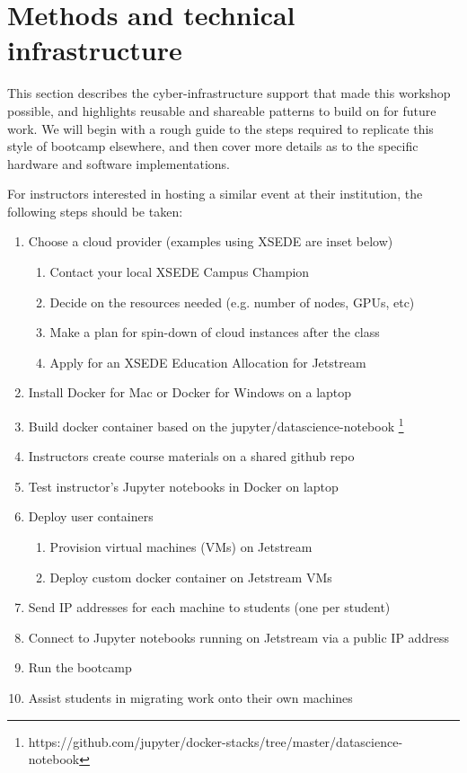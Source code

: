 \section{Methods and technical infrastructure}\label{sec:methods}

This section describes the cyber-infrastructure support that made this workshop possible, and
highlights reusable and shareable patterns to build on for future work. We will
begin with a rough guide to the steps required to replicate this style of
bootcamp elsewhere, and then cover more details as to the specific hardware and
software implementations.

For instructors interested in hosting a similar event at their institution, the
following steps should be taken:

\begin{enumerate}
\item Choose a cloud provider (examples using XSEDE are inset below)
  \begin{enumerate}
    \item Contact your local XSEDE Campus Champion
    \item Decide on the resources needed (e.g. number of nodes, GPUs, etc)
    \item Make a plan for spin-down of cloud instances after the class
    \item Apply for an XSEDE Education Allocation for Jetstream
  \end{enumerate}

\item Install Docker for Mac or Docker for Windows on a laptop
\item Build docker container based on the jupyter/datascience-notebook \footnote{https://github.com/jupyter/docker-stacks/tree/master/datascience-notebook}
\item Instructors create course materials on a shared github repo
\item Test instructor's Jupyter notebooks in Docker on laptop
\item Deploy user containers
  \begin{enumerate}
  \item Provision virtual machines (VMs) on Jetstream
  \item Deploy custom docker container on Jetstream VMs
  \end{enumerate}
\item Send IP addresses for each machine to students (one per student)
\item Connect to Jupyter notebooks running on Jetstream via a public IP address
\item Run the bootcamp
\item Assist students in migrating work onto their own machines
\end{enumerate}


